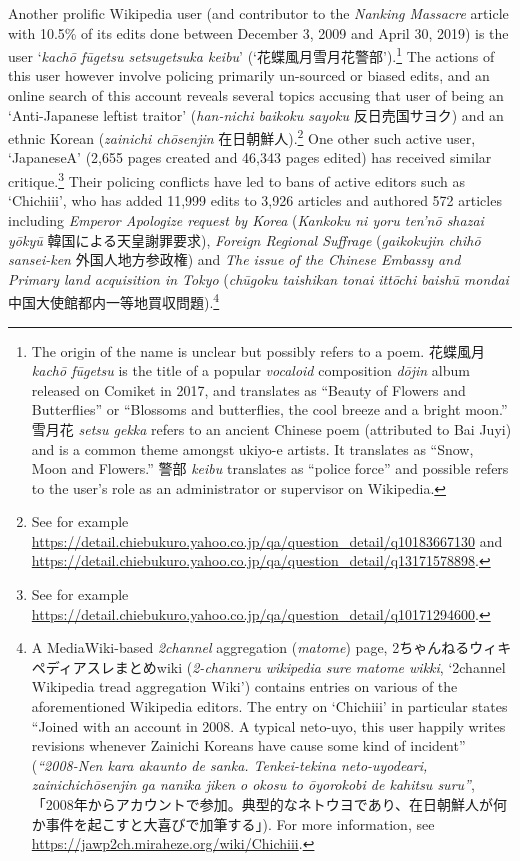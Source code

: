 \documentclass[10pt,british,A4paper,,openany]{memoir}
\begin{document}
Another prolific Wikipedia user (and contributor to the \emph{Nanking
Massacre} article with 10.5\% of its edits done between December 3, 2009
and April 30, 2019) is the user `\emph{kachō fūgetsu setsugetsuka
keibu}' (`花蝶風月雪月花警部').\footnote{The origin of the name is
  unclear but possibly refers to a poem. 花蝶風月 \emph{kachō fūgetsu}
  is the title of a popular \emph{vocaloid} composition \emph{dōjin}
  album released on Comiket in 2017, and translates as ``Beauty of
  Flowers and Butterflies'' or ``Blossoms and butterflies, the cool
  breeze and a bright moon.'' 雪月花 \emph{setsu gekka} refers to an
  ancient Chinese poem (attributed to Bai Juyi) and is a common theme
  amongst ukiyo-e artists. It translates as ``Snow, Moon and Flowers.''
  警部 \emph{keibu} translates as ``police force'' and possible refers
  to the user's role as an administrator or supervisor on Wikipedia.}
The actions of this user however involve policing primarily un-sourced
or biased edits, and an online search of this account reveals several
topics accusing that user of being an `Anti-Japanese leftist traitor'
(\emph{han-nichi baikoku sayoku} 反日売国サヨク) and an ethnic Korean
(\emph{zainichi chōsenjin} 在日朝鮮人).\footnote{See for example
  \url{https://detail.chiebukuro.yahoo.co.jp/qa/question_detail/q10183667130}
  and
  \url{https://detail.chiebukuro.yahoo.co.jp/qa/question_detail/q13171578898}.}
One other such active user, `JapaneseA' (2,655 pages created and 46,343
pages edited) has received similar critique.\footnote{See for example
  \url{https://detail.chiebukuro.yahoo.co.jp/qa/question_detail/q10171294600}.}
Their policing conflicts have led to bans of active editors such as
`Chichiii', who has added 11,999 edits to 3,926 articles and authored
572 articles including \emph{Emperor Apologize request by Korea}
(\emph{Kankoku ni yoru ten'nō shazai yōkyū} 韓国による天皇謝罪要求),
\emph{Foreign Regional Suffrage} (\emph{gaikokujin chihō sansei-ken}
外国人地方参政権) and \emph{The issue of the Chinese Embassy and Primary
land acquisition in Tokyo} (\emph{chūgoku taishikan tonai ittōchi baishū
mondai} 中国大使館都内一等地買収問題).\footnote{A MediaWiki-based
  \emph{2channel} aggregation (\emph{matome}) page,
  2ちゃんねるウィキペディアスレまとめwiki (\emph{2-channeru wikipedia
  sure matome wikki}, `2channel Wikipedia tread aggregation Wiki')
  contains entries on various of the aforementioned Wikipedia editors.
  The entry on `Chichiii' in particular states ``Joined with an account
  in 2008. A typical neto-uyo, this user happily writes revisions
  whenever Zainichi Koreans have cause some kind of incident''
  (\emph{``2008-Nen kara akaunto de sanka. Tenkei-tekina neto-uyodeari,
  zainichichōsenjin ga nanika jiken o okosu to ōyorokobi de kahitsu
  suru''},
  「2008年からアカウントで参加。典型的なネトウヨであり、在日朝鮮人が何か事件を起こすと大喜びで加筆する」).
  For more information, see
  \url{https://jawp2ch.miraheze.org/wiki/Chichiii}.}
\end{document}
